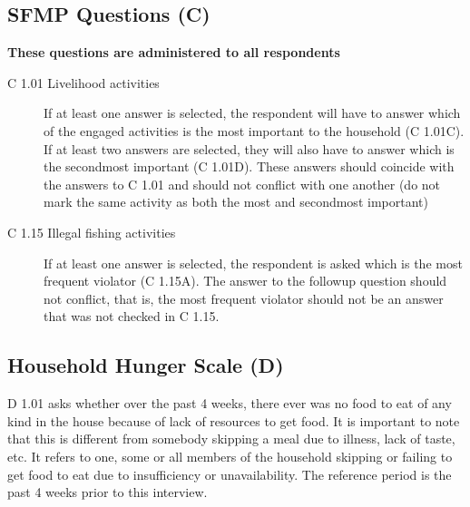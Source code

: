 \documentclass[a4paper]{refart}
\begin{document}
\subsection{SFMP Questions (C)}
\textbf{These questions are administered to all respondents}
\begin{description}







\item[C 1.01 Livelihood activities] If at least one answer is selected, the respondent will have to answer which of the engaged activities is the most important to the household (C 1.01C). If at least two answers are selected, they will also have to answer which is the secondmost important (C 1.01D). These answers should coincide with the answers to C 1.01 and should not conflict with one another (do not mark the same activity as both the most and secondmost important)



\item[C 1.15 Illegal fishing activities] If at least one answer is selected, the respondent is asked which is the most frequent violator (C 1.15A). The answer to the followup question should not conflict, that is, the most frequent violator should not be an answer that was not checked in C 1.15.

\end{description}

\subsection{Household Hunger Scale (D)}

D 1.01 asks whether over the past 4 weeks, there ever was no food to eat of any kind in the house because of lack of resources to get food. It is important to note that this is different from somebody skipping a meal due to illness, lack of taste, etc. It refers to one, some or all members of the household skipping or failing to get food to eat due to insufficiency or unavailability. The reference period is the past 4 weeks prior to this interview.
\end{document}
